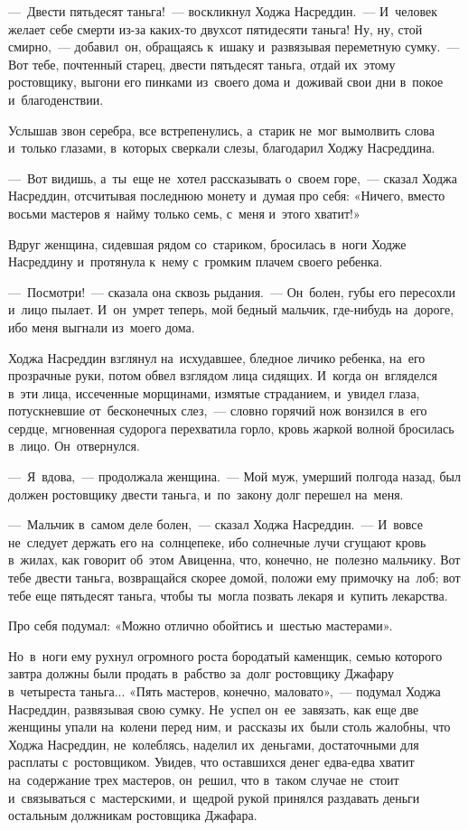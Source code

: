 \documentclass[12pt,a4paper]{book}
\begin{document}
—~Двести пятьдесят таньга!~— воскликнул Ходжа Насреддин.~— И~человек желает себе смерти из-за каких-то двухсот пятидесяти таньга! Ну, ну, стой смирно,~— добавил~он, обращаясь к~ишаку и~развязывая переметную сумку.~— Вот тебе, почтенный старец, двести пятьдесят таньга, отдай их~этому ростовщику, выгони его пинками из~своего дома и~доживай свои дни в~покое и~благоденствии.

Услышав звон серебра, все встрепенулись, а~старик не~мог вымолвить слова и~только глазами, в~которых сверкали слезы, благодарил Ходжу Насреддина.

—~Вот видишь, а~ты~еще не~хотел рассказывать о~своем горе,~— сказал Ходжа Насреддин, отсчитывая последнюю монету и~думая про себя: «Ничего, вместо восьми мастеров я~найму только семь, с~меня и~этого хватит!»

Вдруг женщина, сидевшая рядом со~стариком, бросилась в~ноги Ходже Насреддину и~протянула к~нему с~громким плачем своего ребенка.

—~Посмотри!~— сказала она сквозь рыдания.~— Он~болен, губы его пересохли и~лицо пылает. И~он~умрет теперь, мой бедный мальчик, где-нибудь на~дороге, ибо меня выгнали из~моего дома.

Ходжа Насреддин взглянул на~исхудавшее, бледное личико ребенка, на~его прозрачные руки, потом обвел взглядом лица сидящих. И~когда он~вгляделся в~эти лица, иссеченные морщинами, измятые страданием, и~увидел глаза, потускневшие от~бесконечных слез,~— словно горячий нож вонзился в~его сердце, мгновенная судорога перехватила горло, кровь жаркой волной бросилась в~лицо. Он~отвернулся.

—~Я~вдова,~— продолжала женщина.~— Мой муж, умерший полгода назад, был должен ростовщику двести таньга, и~по~закону долг перешел на~меня.

—~Мальчик в~самом деле болен,~— сказал Ходжа Насреддин.~— И~вовсе не~следует держать его на~солнцепеке, ибо солнечные лучи сгущают кровь в~жилах, как говорит об~этом Авиценна, что, конечно, не~полезно мальчику. Вот тебе двести таньга, возвращайся скорее домой, положи ему примочку на~лоб; вот тебе еще пятьдесят таньга, чтобы ты~могла позвать лекаря и~купить лекарства.

Про себя подумал: «Можно отлично обойтись и~шестью мастерами».

Но~в~ноги ему рухнул огромного роста бородатый каменщик, семью которого завтра должны были продать в~рабство за~долг ростовщику Джафару в~четыреста таньга... «Пять мастеров, конечно, маловато»,~— подумал Ходжа Насреддин, развязывая свою сумку. Не~успел он~ее~завязать, как еще две женщины упали на~колени перед ним, и~рассказы их~были столь жалобны, что Ходжа Насреддин, не~колеблясь, наделил их~деньгами, достаточными для расплаты с~ростовщиком. Увидев, что оставшихся денег едва-едва хватит на~содержание трех мастеров, он~решил, что в~таком случае не~стоит и~связываться с~мастерскими, и~щедрой рукой принялся раздавать деньги остальным должникам ростовщика Джафара.
\end{document}
